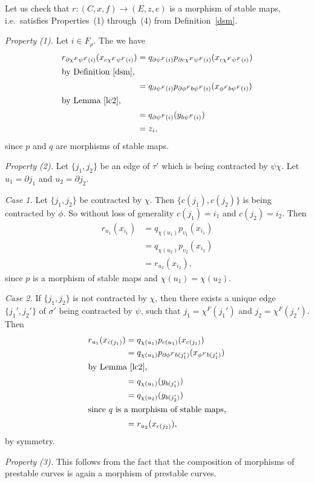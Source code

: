 \documentclass[11pt]{amsart}
\theoremstyle{definition}
\theoremstyle{remark}
\newcommand{\del}{\partial}
\theoremstyle{plain}
\theoremstyle{definition}
\theoremstyle{remark}
\begin{document}
Let us check that \(r:(C,x,f)\rightarrow(E,z,e)\) is a morphism of stable maps,
i.e.\ satisfies Properties~(1) through~(4)
from Definition~\ref{dsm}.

{\em Property (1). }  Let \(i\in F_\rho\). The we have
\begin{align*}
r_{\del\chi^F\psi^F(i)}(x_{c\chi^F\psi^F(i)}) &=  q_{\del\psi^F(i)}p_{\del
c\chi^F\psi^F(i)}(x_{c\chi^F\psi^F(i)}) \\
\intertext{by Definition~\ref{dsm},}
 &=  q_{\del\psi^F(i)}p_{\del\phi^Fb\psi^F(i)}(x_{\phi^Fb\psi^F(i)}) \\
\intertext{by Lemma~\ref{lc2},}
 &=  q_{\del\psi^F(i)}(y_{b\psi^F(i)}) \\
 &=  z_i,
\end{align*}
since \(p\) and \(q\) are morphisms of stable maps.

{\em Property (2). }  Let \(\{j_1,j_2\}\) be an edge of \(\tau'\) which is being
contracted by \(\psi\chi\). Let
\(u_1=\del j_1\) and \(u_2=\del j_2\).

{\em Case 1. } Let \(\{j_1,j_2\}\) be contracted by \(\chi\). Then
\(\{c(j_1),c(j_2)\}\) is being contracted by \(\phi\). So
without loss of generality \(c(j_1)=i_1\) and \(c(j_2)=i_2\). Then
\begin{align*}
r_{u_1}(x_{i_1}) & =  q_{\chi(u_1)}p_{v_1}(x_{i_1}) \\
 & =  q_{\chi(u_2)}p_{v_2}(x_{i_2}) \\
 & =  r_{u_2}(x_{i_2}),
\end{align*}
since \(p\) is a morphism of stable maps and \(\chi(u_1)=\chi(u_2)\).

{\em Case 2. } If \(\{j_1,j_2\}\) is not contracted by \(\chi\), then there exists
a unique edge \(\{j_1',j_2'\}\) of
\(\sigma'\) being contracted by \(\psi\), such that \(j_1=\chi^F(j_1')\) and
\(j_2=\chi^F(j_2')\). Then
\begin{align*}
r_{u_1}(x_{c(j_1)}) & =  q_{\chi(u_1)}p_{c(u_1)}(x_{c(j_1)}) \\
 & =  q_{\chi(u_1)}p_{\del\phi^Fb(j_1')}(x_{\phi^Fb(j_1')}) \\
\intertext{by Lemma~\ref{lc2},}
 & =  q_{\chi(u_1)}(y_{b(j_1')}) \\
 & =  q_{\chi(u_2)}(y_{b(j_2')}) \\
\intertext{since \(q\) is a morphism of stable maps,}
 & =  r_{u_2}(x_{c(j_2)}),
\end{align*}
by symmetry.

{\em Property (3). } This follows from the fact that the composition of
morphisms of prestable curves is again
a morphism of prestable curves.
\end{document}
